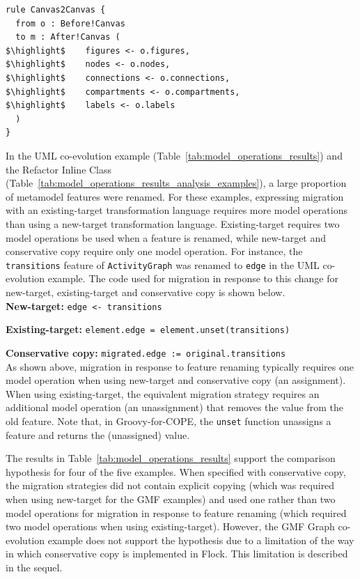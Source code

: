 \begin{lstlisting}[float=tbp, caption=An extract of the GMF Graph model migration in ATL, label=lst:graph_atl_canvas_rule, language=ATL]
rule Canvas2Canvas {
  from o : Before!Canvas
  to m : After!Canvas (
$\highlight$    figures <- o.figures,
$\highlight$    nodes <- o.nodes,
$\highlight$    connections <- o.connections,
$\highlight$    compartments <- o.compartments,
$\highlight$    labels <- o.labels
  )
}
\end{lstlisting}

In the UML co-evolution example (Table~\ref{tab:model_operations_results}) and the Refactor Inline Class (Table~\ref{tab:model_operations_results_analysis_examples}), a large proportion of metamodel features were renamed. For these examples, expressing migration with an existing-target transformation language requires more model operations than using a new-target transformation language. Existing-target requires two model operations be used when a feature is renamed, while new-target and conservative copy require only one model operation. For instance, the \texttt{transitions} feature of \texttt{ActivityGraph} was renamed to \texttt{edge} in the UML co-evolution example. The code used for migration in response to this change for new-target, existing-target and conservative copy is shown below. \\

\textbf{New-target:} \texttt{edge <- transitions}

\textbf{Existing-target:} \texttt{element.edge = element.unset(transitions)}

\textbf{Conservative copy:} \texttt{migrated.edge := original.transitions}
\\

As shown above, migration in response to feature renaming typically requires one model operation when using new-target and conservative copy (an assignment). When using existing-target, the equivalent migration strategy requires an additional model operation (an unassignment) that removes the value from the old feature. Note that, in Groovy-for-COPE, the \texttt{unset} function unassigns a feature and returns the (unassigned) value.


The results in Table~\ref{tab:model_operations_results} support the comparison hypothesis for four of the five examples. When specified with conservative copy, the migration strategies did not contain explicit copying (which was required when using new-target for the GMF examples) and used one rather than two model operations for migration in response to feature renaming (which required two model operations when using existing-target). However, the GMF Graph co-evolution example does not support the hypothesis due to a limitation of the way in which conservative copy is implemented in Flock. This limitation is described in the sequel. 

